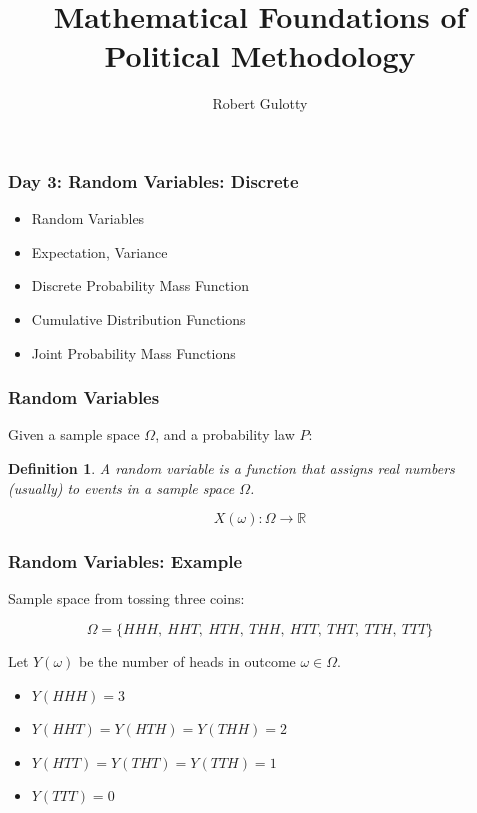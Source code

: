 \documentclass[handout]{beamer}
\title[PLSC 43401]{Mathematical Foundations of Political Methodology}
\author{Robert Gulotty}
\institute[Chicago]{University of Chicago}
\newtheorem{defn}{Definition}
\numberwithin{equation}{section}
\begin{document}
\begin{frame}
\maketitle
\end{frame}


\begin{frame}
\frametitle{Day 3: Random Variables: Discrete}

\begin{itemize}
\item Random Variables
\item Expectation, Variance
\item Discrete Probability Mass Function
\item Cumulative Distribution Functions
\item Joint Probability Mass Functions
\end{itemize}
\end{frame}


\begin{frame}
\frametitle{Random Variables}
Given a sample space $\Omega$, and a probability law $P$:
\begin{defn}
A \emph{random variable} is a \alert{function} that assigns real numbers (usually) to events in a sample space $\Omega$.
\end{defn}
$$X(\omega): \Omega \to \mathbb{R}$$

\end{frame}



\begin{frame}
\frametitle{Random Variables: Example}
Sample space from tossing three coins: 

$$\Omega=\{ HHH,\ HHT,\ HTH,\ THH,\ HTT,\ THT,\ TTH,\ TTT\}$$

Let $Y(\omega)$ be the number of heads in outcome $\omega \in \Omega$.\pause

\begin{itemize}
\item $Y(HHH)=3$\pause
\item $Y(HHT)=Y(HTH)=Y(THH)=2$\pause
\item $Y(HTT)= Y(THT)=Y(TTH)=1$\pause
\item $Y(TTT)=0$
\end{itemize}
\end{frame}
\end{document}
